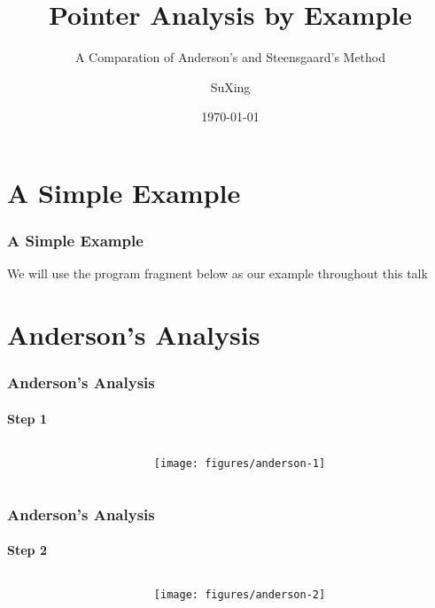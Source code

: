 \documentclass[]{beamer}
\title{Pointer Analysis by Example}
\subtitle{A Comparation of Anderson's and Steensgaard's Method}
\author[SuXing~pysuxing@gmail.com]{SuXing}
\institute{TOW}
\date{\today}
\begin{document}
\setlength{\parindent}{0pt}

\frame{\titlepage}
\frame{\tableofcontents}

\section{A Simple Example}
\frame{\tableofcontents[currentsection]}

\begin{frame}
  \frametitle{A Simple Example}
  We will use the program fragment below as our example throughout
  this talk
  \pause\vspace{1em}
  
\end{frame}

\section{Anderson's Analysis}
\frame{\tableofcontents[currentsection]}

\begin{frame}
  \frametitle{Anderson's Analysis}
  \framesubtitle{Step 1}
  \begin{columns}
    \begin{column}{.4\textwidth}
      
      
    \end{column}
    \begin{column}{.6\textwidth}
      \texttt{[image: figures/anderson-1]}
    \end{column}
  \end{columns}
\end{frame}

\begin{frame}
  \frametitle{Anderson's Analysis}
  \framesubtitle{Step 2}
  \begin{columns}
    \begin{column}{.4\textwidth}
      
      
    \end{column}
    \begin{column}{.6\textwidth}
      \texttt{[image: figures/anderson-2]}
    \end{column}
  \end{columns}
\end{frame}
\end{document}
